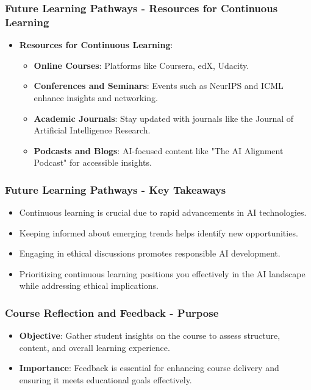 \documentclass[aspectratio=169]{beamer}
\begin{document}
\begin{frame}[fragile]
    \frametitle{Future Learning Pathways - Resources for Continuous Learning}
    \begin{itemize}
        \item \textbf{Resources for Continuous Learning}:
            \begin{itemize}
                \item \textbf{Online Courses}: Platforms like Coursera, edX, Udacity.
                \item \textbf{Conferences and Seminars}: Events such as NeurIPS and ICML enhance insights and networking.
                \item \textbf{Academic Journals}: Stay updated with journals like the Journal of Artificial Intelligence Research.
                \item \textbf{Podcasts and Blogs}: AI-focused content like "The AI Alignment Podcast" for accessible insights.
            \end{itemize}
    \end{itemize}
\end{frame}

\begin{frame}[fragile]
    \frametitle{Future Learning Pathways - Key Takeaways}
    \begin{itemize}
        \item Continuous learning is crucial due to rapid advancements in AI technologies.
        \item Keeping informed about emerging trends helps identify new opportunities.
        \item Engaging in ethical discussions promotes responsible AI development.
        \item Prioritizing continuous learning positions you effectively in the AI landscape while addressing ethical implications.
    \end{itemize}
\end{frame}

\begin{frame}[fragile]
  \frametitle{Course Reflection and Feedback - Purpose}
  \begin{itemize}
    \item \textbf{Objective}: Gather student insights on the course to assess structure, content, and overall learning experience.
    \item \textbf{Importance}: Feedback is essential for enhancing course delivery and ensuring it meets educational goals effectively.
  \end{itemize}
\end{frame}
\end{document}
